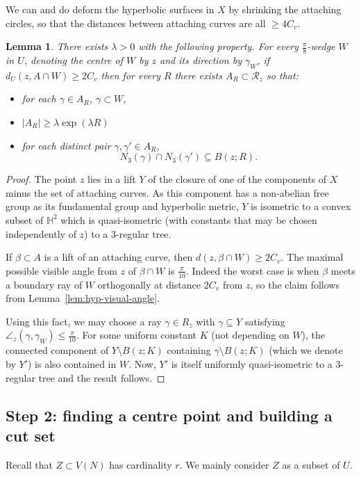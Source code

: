 \documentclass[11pt]{amsart}
\numberwithin{equation}{section}
\newtheorem{lemma}[equation]{Lemma}
\theoremstyle{citing}
\newcommand{\HH}{\mathbb{H}}
\numberwithin{equation}{section}
\begin{document}
We can and do deform the hyperbolic surfaces in $X$ by shrinking the attaching circles, so that the distances between attaching curves are all $\geq 4C_v$.

\begin{lemma}\label{lem:expmany} There exists $\lambda>0$ with the following property.  For every $\frac{\pi}{8}$-wedge $W$ in $U$, denoting the centre of $W$ by $z$ and its direction by $\gamma_W$, if  $d_U(z,A\cap W)\geq 2C_v$ then for every $R$ there
exists $A_R\subset\mathcal R_z$ so that:
\begin{itemize}
    \item for each $\gamma\in A_R$, $\gamma\subset W$,
    \item $|A_R|\geq \lambda\exp(\lambda R)$
    \item for each distinct pair $\gamma,\gamma'\in A_R$,
    \[
     N_3(\gamma)\cap N_3(\gamma') \subseteq B(z;R).
    \]
\end{itemize}
\end{lemma}
\begin{proof}
    The point $z$ lies in a lift $Y$ of the closure of one of the components of $X$ minus the set of attaching curves. As this component has a non-abelian free group as its fundamental group and hyperbolic metric, $Y$ is isometric to a convex subset of $\HH^2$ which is quasi-isometric (with constants that may be chosen independently of $z$) to a $3$-regular tree.  

	If $\beta \subset A$ is a lift of an attaching curve, then $d(z,\beta\cap W)\geq 2C_v$.  The maximal possible visible angle from $z$ of $\beta \cap W$ is $\frac{\pi}{10}$.  Indeed the worst case is when $\beta$ meets a boundary ray of $W$ orthogonally at distance $2C_v$ from $z$, so the claim follows from Lemma~\ref{lem:hyp-visual-angle}. 
	
	Using this fact, we may choose a ray $\gamma\in R_z$ with $\gamma\subseteq Y$ satisfying $\angle_z(\gamma,\gamma_W)\leq \frac{\pi}{10}$. For some uniform constant $K$ (not depending on $W$), the connected component of $Y\setminus B(z;K)$ containing $\gamma\setminus B(z;K)$ (which we denote by $Y'$) is also contained in $W$. Now, $Y'$ is itself uniformly quasi-isometric to a $3$-regular tree and the result follows.
\end{proof}


\subsection*{Step 2: finding a centre point and building a cut set}
Recall that $Z\subset V(N)$ has cardinality $r$. We mainly consider $Z$ as a subset of $U$.
\end{document}
